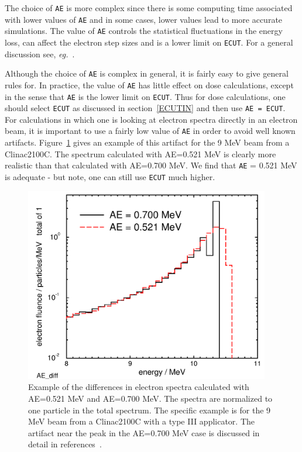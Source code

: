 \documentclass[12pt,twoside]{article}
\newcommand{\eg}{{\em eg.}}
\begin{document}
The choice of \verb+AE+
is more complex since there is some computing time associated
with lower values of \verb+AE+ and in some cases, lower values lead to
more accurate simulations.
The value of \verb+AE+ controls the statistical fluctuations in the
energy loss, can affect the electron step sizes and is a lower limit on
\verb+ECUT+. For a general discussion see, \eg\ \cite{Ro84,RB90}.

Although the choice of \verb+AE+ is complex in general,
it is fairly easy to give general rules for.
In practice, the value of \verb+AE+ has little effect on dose
calculations, except in the sense that  \verb+AE+ is the lower limit on
\verb+ECUT+.  Thus for dose calculations, one should select \verb+ECUT+
as discussed in section~\ref{ECUTIN} and then use  \verb+AE = ECUT+.
For calculations in which one is looking at electron spectra directly in
an electron beam, it is important to use a fairly low value of
\verb+AE+ in order to avoid well known artifacts\cite{Ro84,RB90}.
Figure~\ref{fig_AE_diff} gives an example of this artifact for the 9 MeV
beam from a Clinac2100C.  The spectrum calculated with AE=0.521 MeV is
clearly more realistic than that calculated with AE=0.700 MeV.
We find that \verb+AE+ = 0.521 MeV is adequate - but note, one can still
use \verb+ECUT+ much higher.

\vspace{5mm}
\begin{figure}[htbp]
\begin{center}
\leavevmode
\mbox{}\hspace{0cm}
\includegraphics[height=8.5cm]{figures/AE_diff}
\caption[Example of effects of AE=0.521 vs 0.700 on electron beam energy
spectrum.] {Example of the differences in electron spectra calculated
with AE=0.521 MeV and AE=0.700 MeV. The spectra are normalized to one
particle in the total spectrum. The specific example is for the 9
MeV beam from a Clinac2100C with a type III applicator.  The artifact
near the peak in the AE=0.700 MeV case is discussed in detail in
references~\cite{Ro84,RB90}.}
\label{fig_AE_diff}
\end{center}
\end{figure}
\end{document}
